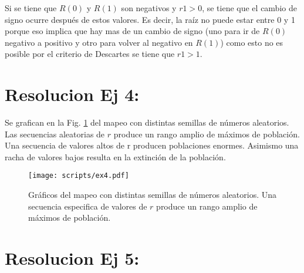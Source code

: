 \documentclass[twocolumn,aps,prl]{revtex4-1}
\begin{document}
Si se tiene que $R(0)$ y $R(1)$ son negativos y $r1>0$, se tiene que el cambio de signo ocurre después de estos valores. Es decir, la raíz no puede estar entre 0 y 1 porque eso implica que hay mas de un cambio de signo (uno para ir de $R(0)$ negativo a positivo y otro para volver al negativo en $R(1)$) como esto no es posible por el criterio de Descartes se tiene que $r1>1$.

% 
%                             
% 

\section{Resolucion Ej 4:}

Se grafican en la Fig. \ref{fig:scripts/ex4} del mapeo con distintas semillas de números aleatorios. Las secuencias aleatorias de $r$ produce un rango amplio de máximos de población. Una secuencia de valores altos de r producen poblaciones enormes. Asimismo una racha de valores bajos resulta en la extinción de la población.

\begin{figure}[ht!]
    \centering
        \centering
        \texttt{[image: scripts/ex4.pdf]}
        \caption{Gráficos del mapeo con distintas semillas de números aleatorios. Una secuencia especifica de valores de $r$ produce un rango amplio de máximos de población.}
        \label{fig:scripts/ex4}
\end{figure}

% 
%                             
% 

\section{Resolucion Ej 5:}
\end{document}
